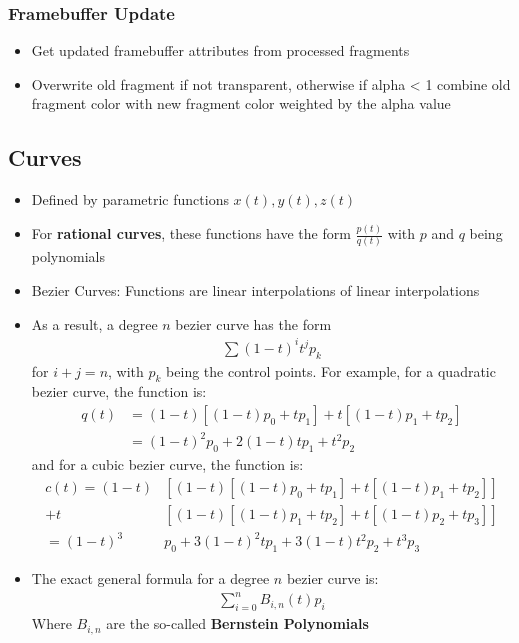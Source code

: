 \documentclass{scrartcl}
\begin{document}
\subsubsection*{Framebuffer Update}
\begin{itemize}
    \item Get updated framebuffer attributes from processed fragments
    \item Overwrite old fragment if not transparent, otherwise if alpha < 1 combine old fragment color with new fragment color weighted by the alpha value
\end{itemize}
\subsection*{Curves}
\begin{itemize}
    \item Defined by parametric functions $x(t), y(t), z(t)$
    \item For \textbf{rational curves}, these functions have the form $\frac{p(t)}{q(t)}$ with $p$ and $q$ being polynomials
    \item Bezier Curves: Functions are linear interpolations of linear interpolations
    \item As a result, a degree $n$ bezier curve has the form 
    \begin{align*}
        \sum (1-t)^it^jp_k   
    \end{align*} for $i+j = n$, with $p_k$ being the control points.
    For example, for a quadratic bezier curve, the function is:
    \begin{align*}
        q(t) &= (1-t)[(1-t)p_0 + tp_1] + t[(1-t)p_1 + tp_2]\\
        &= (1-t)^2p_0 + 2(1-t)tp_1 + t^2p_2
    \end{align*}
    and for a cubic bezier curve, the function is:
    \begin{align*}
        c(t) = (1-t)&[(1-t)[(1-t)p_0 + tp_1] + t[(1-t)p_1 + tp_2]]\\
        +  t&[(1-t)[(1-t)p_1 + tp_2] + t[(1-t)p_2 + tp_3]]\\
        = (1-t)^3&p_0 + 3(1-t)^2tp_1 + 3(1-t)t^2p_2 + t^3p_3
    \end{align*}
    \item The exact general formula for a degree $n$ bezier curve is:
    \begin{align*}
        \sum^{n}_{i=0} B_{i,n}(t)p_i
    \end{align*}
    Where $B_{i,n}$ are the so-called \textbf{Bernstein Polynomials}

\end{itemize}
\end{document}

